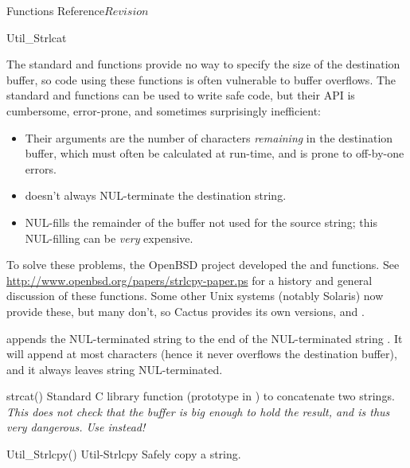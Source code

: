 \begin{cactuspart}{ Functions Reference}{}{$Revision$}
\begin{FunctionDescription}{Util\_Strlcat}
\begin{Discussion}
The standard  and  functions provide
no way to specify the size of the destination buffer, so code using
these functions is often vulnerable to buffer overflows.  The standard
 and  functions can be used to write
safe code, but their API is cumbersome, error-prone, and sometimes
surprisingly inefficient:
\begin{itemize}
\item	Their  arguments are the number of characters
	{\em remaining\/} in the destination buffer, which must
	often be calculated at run-time, and is prone to off-by-one
	errors.
\item	{} doesn't always NUL-terminate the destination string.
\item	{} NUL-fills the remainder of the buffer not
	used for the source string; this NUL-filling can be {\em very\/}
	expensive.
\end{itemize}

To solve these problems, the OpenBSD project developed the
 and  functions.  See
\url{http://www.openbsd.org/papers/strlcpy-paper.ps}
for a history and general discussion of these functions.
Some other Unix systems (notably Solaris) now provide these,
but many don't, so Cactus provides its own versions,
 and .

 appends the NUL-terminated string  to the
end of the NUL-terminated string .  It will append at most
 characters (hence it never overflows the
destination buffer), and it always leaves  string NUL-terminated.
\end{Discussion}

\begin{SeeAlsoSection}
\begin{SeeAlso}{strcat()}
Standard C library function (prototype in )
to concatenate two strings.
{\em This does not check that the buffer is big enough to hold the result,
and is thus very dangerous.  Use  instead!}
\end{SeeAlso}
\begin{SeeAlso2} {Util\_Strlcpy()} {Util-Strlcpy}
Safely copy a string.
\end{SeeAlso2}
\end{SeeAlsoSection}


\end{FunctionDescription}
\end{cactuspart}
